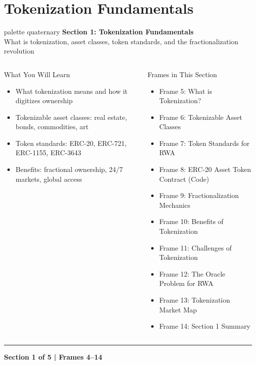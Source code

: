 \documentclass[8pt,aspectratio=169]{beamer}
\newcommand{\bottomnote}[1]{\vfill\vspace{-2mm}\textcolor{mllavender2}{\rule{\textwidth}{0.4pt}}\vspace{1mm}\footnotesize\textbf{#1}}
\begin{document}
\section{Tokenization Fundamentals}

\begin{frame}{}
\begin{beamercolorbox}[sep=12pt,center,rounded=true,shadow=true]{palette quaternary}
  {\Large\bfseries Section 1: Tokenization Fundamentals}\\[6pt]
  {\normalsize What is tokenization, asset classes, token standards, and the fractionalization revolution}
\end{beamercolorbox}
\vspace{4mm}
\begin{columns}[T]
\begin{block}{What You Will Learn}
\footnotesize
\begin{itemize}
  \item What tokenization means and how it digitizes ownership
  \item Tokenizable asset classes: real estate, bonds, commodities, art
  \item Token standards: ERC-20, ERC-721, ERC-1155, ERC-3643
  \item Benefits: fractional ownership, 24/7 markets, global access
\end{itemize}
\end{block}
\begin{block}{Frames in This Section}
\footnotesize
\begin{itemize}
  \item Frame 5: What is Tokenization?
  \item Frame 6: Tokenizable Asset Classes
  \item Frame 7: Token Standards for RWA
  \item Frame 8: ERC-20 Asset Token Contract (Code)
  \item Frame 9: Fractionalization Mechanics
  \item Frame 10: Benefits of Tokenization
  \item Frame 11: Challenges of Tokenization
  \item Frame 12: The Oracle Problem for RWA
  \item Frame 13: Tokenization Market Map
  \item Frame 14: Section 1 Summary
\end{itemize}
\end{block}
\end{columns}
\bottomnote{Section 1 of 5 | Frames 4--14}
\end{frame}
\end{document}

